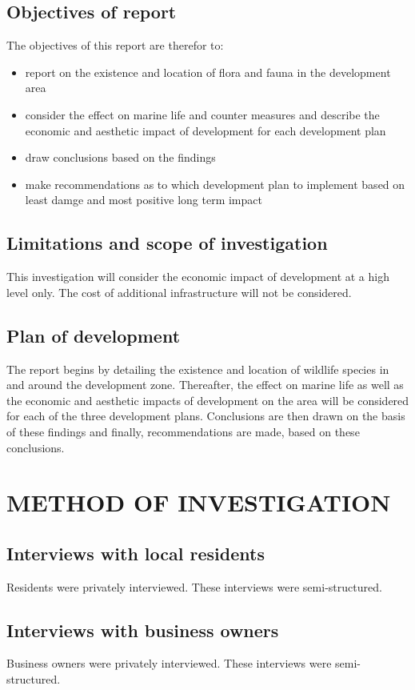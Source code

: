 \documentclass{article}
\begin{document}
\subsection{Objectives of report}
The objectives of this report are therefor to:
\begin{itemize}
	\item report on the existence and location of flora and fauna in the development area
	\item consider the effect on marine life and counter measures and describe the economic and aesthetic impact of development for each development plan
	\item draw conclusions based on the findings
	\item make recommendations as to which development plan to implement based on least damge and most positive long term impact
\end{itemize}

\subsection{Limitations and scope of investigation}
This investigation will consider the economic impact of development at a high level only. The cost of additional infrastructure will not be considered.

\subsection{Plan of development}
The report begins by detailing the existence and location of wildlife species in and around the development zone. Thereafter, the effect on marine life as well as the economic and aesthetic impacts of development on the area will be considered for each of the three development plans. Conclusions are then drawn on the basis of these findings and finally, recommendations are made, based on these conclusions.

\newpage
\section{METHOD OF INVESTIGATION}
\subsection{Interviews with local residents}
Residents were privately interviewed. These interviews were semi-structured.

\subsection{Interviews with business owners}
Business owners were privately interviewed. These interviews were semi-structured.
\end{document}
